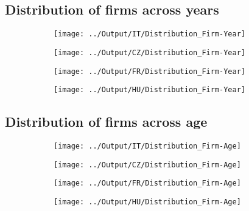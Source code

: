 \documentclass[12pt,notitlepage]{article}
\begin{document}
\subsection{Distribution of firms across years}

\begin{figure}[!htpb]
\centering
\caption{Distribution of firms across years}
\begin{subfigure}{.49\textwidth}
    \centering
 \texttt{[image: ../Output/IT/Distribution\_Firm-Year]}
\end{subfigure}%
\begin{subfigure}{.49\textwidth}
    \centering
 \texttt{[image: ../Output/CZ/Distribution\_Firm-Year]}
\end{subfigure}
\begin{subfigure}{.49\textwidth}
    \centering
 \texttt{[image: ../Output/FR/Distribution\_Firm-Year]}
\end{subfigure}%
\begin{subfigure}{.49\textwidth}
    \centering
 \texttt{[image: ../Output/HU/Distribution\_Firm-Year]}
\end{subfigure}
\end{figure}
\pagebreak

\subsection{Distribution of firms across age}

\begin{figure}[!htpb]
\centering
\caption{Distribution of firms across age}
\begin{subfigure}{.49\textwidth}
    \centering
 \texttt{[image: ../Output/IT/Distribution\_Firm-Age]}
\end{subfigure}%
\begin{subfigure}{.49\textwidth}
    \centering
 \texttt{[image: ../Output/CZ/Distribution\_Firm-Age]}
\end{subfigure}
\begin{subfigure}{.49\textwidth}
    \centering
 \texttt{[image: ../Output/FR/Distribution\_Firm-Age]}
\end{subfigure}%
\begin{subfigure}{.49\textwidth}
    \centering
 \texttt{[image: ../Output/HU/Distribution\_Firm-Age]}
\end{subfigure}
\end{figure}
\pagebreak
\end{document}
